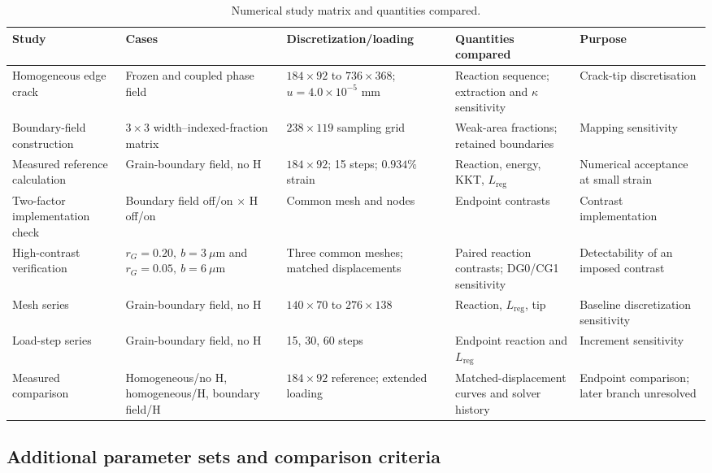 \documentclass[preprint,12pt]{elsarticle}
\begin{document}
\begin{table}[t]
\centering
\caption{Numerical study matrix and quantities compared.}
\label{tab:2}
\scriptsize
\setlength{\tabcolsep}{4pt}
\begin{tabularx}{\textwidth}{XXXXX}
\toprule
\textbf{Study} & \textbf{Cases} & \textbf{Discretization/loading} & \textbf{Quantities compared} & \textbf{Purpose} \\
\midrule
Homogeneous edge crack & Frozen and coupled phase field & \(184\times92\) to \(736\times368\); \(u=4.0\times10^{-5}\) mm & Reaction sequence; extraction and \(\kappa\) sensitivity & Crack-tip discretisation \\
Boundary-field construction & \(3\times3\) width--indexed-fraction matrix & \(238\times119\) sampling grid & Weak-area fractions; retained boundaries & Mapping sensitivity \\
Measured reference calculation & Grain-boundary field, no H & \(184\times92\); 15 steps; \(0.934\%\) strain & Reaction, energy, KKT, \(L_{\mathrm{reg}}\) & Numerical acceptance at small strain \\
Two-factor implementation check & Boundary field off/on \(\times\) H off/on & Common mesh and nodes & Endpoint contrasts & Contrast implementation \\
High-contrast verification & \(r_G=0.20,\ b=3~\mu\mathrm{m}\) and \(r_G=0.05,\ b=6~\mu\mathrm{m}\) & Three common meshes; matched displacements & Paired reaction contrasts; DG0/CG1 sensitivity & Detectability of an imposed contrast \\
Mesh series & Grain-boundary field, no H & \(140\times70\) to \(276\times138\) & Reaction, \(L_{\mathrm{reg}}\), tip & Baseline discretization sensitivity \\
Load-step series & Grain-boundary field, no H & 15, 30, 60 steps & Endpoint reaction and \(L_{\mathrm{reg}}\) & Increment sensitivity \\
Measured comparison & Homogeneous/no H, homogeneous/H, boundary field/H & \(184\times92\) reference; extended loading & Matched-displacement curves and solver history & Endpoint comparison; later branch unresolved \\
\bottomrule
\end{tabularx}
\end{table}

\subsection{Additional parameter sets and comparison criteria}
\end{document}
